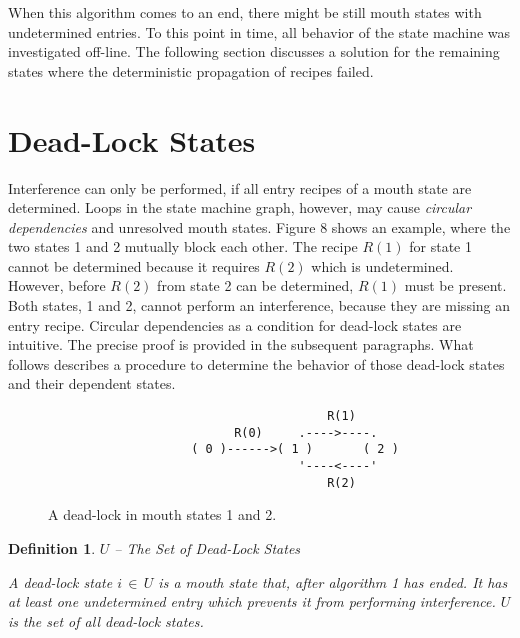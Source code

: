 \documentclass[12pt,a4paper]{scrartcl}
\theoremstyle{break}
\newtheorem{definition}{Definition}
\begin{document}
When this algorithm comes to an end, there might be still mouth states with
undetermined entries.  To this point in time, all behavior of the state
machine was investigated off-line. The following section discusses a solution 
for the remaining states where the deterministic propagation of recipes failed.

%
\section{Dead-Lock States}

Interference can only be performed, if all entry recipes of a mouth state are
determined. Loops in the state machine graph, however, may cause {\it circular
dependencies} and unresolved mouth states.  Figure 8 shows an example, where the
two states 1 and 2 mutually block each other. The recipe $R(1)$ for state 1
cannot be determined because it requires $R(2)$ which is undetermined. However,
before $R(2)$ from state 2 can be determined, $R(1)$ must be present. Both
states, 1 and 2, cannot perform an interference, because they are missing an
entry recipe.  Circular dependencies as a condition for dead-lock states are
intuitive. The precise proof is provided in the subsequent paragraphs. What
follows describes a procedure to determine the behavior of those dead-lock
states and their dependent states.

\begin{figure}[htbp] \leavevmode
\begin{verbatim}
                                       R(1)
                          R(0)     .---->----.
                    ( 0 )------>( 1 )       ( 2 )
                                   '----<----'
                                       R(2)

\end{verbatim}
\caption{A dead-lock in mouth states 1 and 2.}
\end{figure}

\begin{definition} $U$ -- The Set of Dead-Lock States

A dead-lock state $i\,\in\,U$ is a mouth state that, after algorithm 1 has
ended. It has at least one undetermined entry which prevents it from performing
interference. $U$ is the set of all dead-lock states.

\end{definition}
\end{document}
